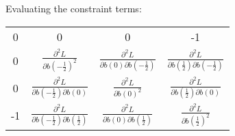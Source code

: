 \documentclass[12pt]{article}
\begin{document}
Evaluating the constraint terms:\\
\begin{tabular}{cccc}
			0 & 0 & 0 & -1 \\
			0 & $\frac{\partial^2 L}{\partial b\left(-\frac{1}{2}\right)^2}$ & $\frac{\partial^2 L}{\partial b(0)\partial b\left(-\frac{1}{2}\right)}$ & $\frac{\partial^2 L}{\partial b\left(\frac{1}{2}\right)\partial b\left(-\frac{1}{2}\right)}$  \\
			0 & $\frac{\partial^2 L}{\partial b\left(-\frac{1}{2}\right)\partial b\left(0\right)}$ & $\frac{\partial^2 L}{\partial b(0)^2}$ & $\frac{\partial^2 L}{\partial b\left(\frac{1}{2}\right)\partial b\left(0\right)}$ \\
			-1 & $\frac{\partial^2 L}{\partial b\left(-\frac{1}{2}\right)\partial b\left(\frac{1}{2}\right)}$ & $\frac{\partial^2 L}{\partial b(0) \partial b\left(\frac{1}{2}\right)}$ & $\frac{\partial^2 L}{\partial b\left(\frac{1}{2}\right)^2}$
		\end{tabular}
\end{document}
